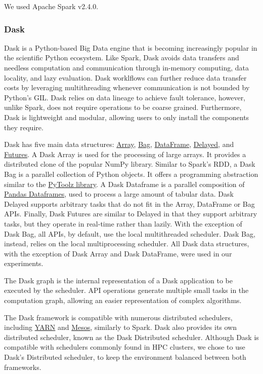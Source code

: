 \documentclass[conference]{IEEEtran}
\begin{document}
We used Apache Spark v2.4.0.

\subsubsection{Dask} Dask is a Python-based Big Data engine that is becoming
increasingly popular in the scientific Python ecosystem. Like Spark, Dask avoids data transfers and needless computation and communication through
in-memory computing, data locality, and lazy evaluation. Dask worklflows can 
further reduce data transfer costs by leveraging multithreading whenever 
communication is not bounded by Python's GIL. Dask relies on data 
lineage to achieve fault tolerance, however, unlike Spark, does not require
operations to be coarse grained. Furthermore, Dask is lightweight and modular,
allowing users to only install the components they require.

Dask has five main data structures:
\href{https://docs.dask.org/en/latest/array.html}{Array}, \href{https://docs.dask.org/en/latest/bag.html}{Bag},
\href{https://docs.dask.org/en/latest/dataframe.html}{DataFrame},
 \href{https://docs.dask.org/en/latest/delayed.html}{Delayed}, 
 and \href{https://docs.dask.org/en/latest/futures.html}{Futures}. A Dask
Array is used for the
processing of large arrays. It provides a distributed clone of the popular NumPy
library. Similar to Spark's RDD, a Dask
Bag is a parallel
collection of Python objects. It offers a programming abstraction similar to the
\href{https://toolz.readthedocs.io/en/latest/}{PyToolz library}. A Dask
Dataframe is a parallel
composition of
\href{http://pandas.pydata.org/pandas-docs/stable/reference/api/pandas.DataFrame.html}{Pandas Dataframes},
 used to process a large amount of tabular data.
Dask Delayed supports
arbitrary tasks
that do not fit in the Array, DataFrame or Bag APIs. Finally,
Dask Futures are similar to
Delayed in that they support arbitrary tasks, but they operate in real-time
rather than lazily. With the exception of Dask Bag, all APIs, by default, use
the local multithreaded scheduler. Dask Bag, instead, relies on the local
multiprocessing scheduler.  All Dask data structures, with the exception of
Dask Array and Dask DataFrame, were used in our experiments.


The Dask graph is the internal representation of a Dask application to be
executed  by the scheduler. API operations generate multiple small tasks in
the computation graph, allowing an easier representation of complex
algorithms.

The Dask framework is compatible with numerous distributed schedulers, including 
\href{https://github.com/dask/dask-yarn}{YARN} and
\href{https://github.com/mrocklin/dask-mesos}{Mesos}, similarly to Spark. Dask 
also provides its own distributed scheduler, known as the Dask Distributed
scheduler. Although Dask is compatible with schedulers commonly found in HPC
clusters, we chose to use Dask's Distributed scheduler, to keep the environment
balanced between both frameworks.
\end{document}

